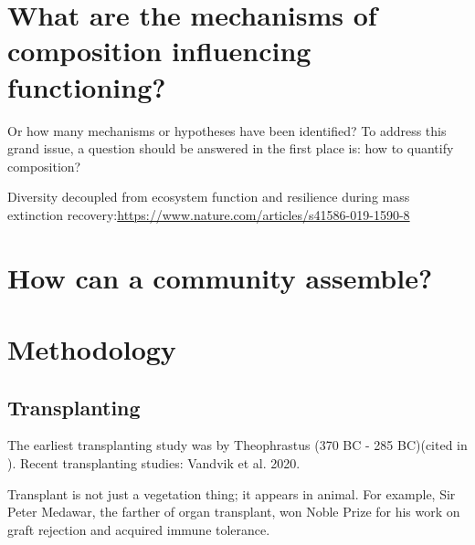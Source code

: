 \documentclass[letterpaper, 10pt]{article}
\begin{document}
\section{What are the mechanisms of composition influencing functioning?}
Or how many mechanisms or hypotheses have been identified? To address this grand issue, a question
should be answered in the first place is: how to quantify composition?

Diversity decoupled from ecosystem function and resilience during mass extinction recovery:\url{https://www.nature.com/articles/s41586-019-1590-8}


\section{How can a community assemble?}


\section{Methodology}

\subsection{Transplanting}
The earliest transplanting study was by Theophrastus (370 BC - 285 BC)(cited in \citet{woodward1987climate}). Recent
transplanting studies: Vandvik et al. 2020\citep{vandvik2020biotic}.

Transplant is not just a vegetation thing; it appears in animal. For example, Sir Peter Medawar, the farther of
organ transplant, won Noble Prize for his work on graft rejection and acquired immune tolerance.




\end{document}
